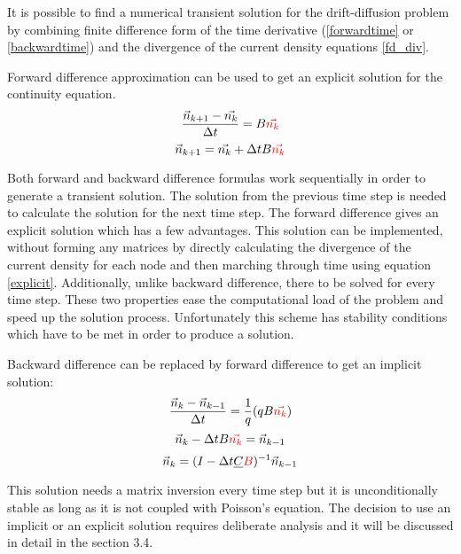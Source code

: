 \begin{doublespace}
It is possible to find a numerical transient solution for the drift-diffusion problem by combining finite difference form of the time derivative (\eqref{forwardtime} or \eqref{backwardtime}) and the divergence of the current density equations \eqref{fd_div}.

Forward difference approximation can be used to get an explicit solution for the continuity equation\cite{Dragica1}.
\begin{equation}\nonumber
\frac{ \vec{n}_{k+1}-\vec{n_k}}{\Delta t}=B \textcolor{red}{\vec{n_k}}
\end{equation}
\begin{equation}
\vec{n}_{k+1}=\vec{n_{k}}+\Delta t B \tjs{\vec{n_k}}
\label{explicit}
\end{equation}

Both forward and backward difference formulas work sequentially in order to generate a transient solution. The solution from the previous time step is needed to calculate the solution for the next time step. The forward difference gives an explicit solution which has a few advantages. This solution can be implemented, without forming any matrices by directly calculating the divergence of the current density for each node and then marching through time using equation \ref{explicit}. Additionally, unlike backward difference, there  to be solved for every time step. These two properties ease the computational load of the problem and speed up the solution process. Unfortunately this scheme has stability conditions which have to be met in order to produce a solution\cite{Dragica1}.

Backward difference can be replaced by forward difference to get an implicit solution:
\begin{equation}\nonumber
\frac{ \vec{n}_{k}-\vec{n}_{k-1}}{\Delta t}=\frac{1}{q}(qB\textcolor{red}{\vec{n_k}})
\end{equation}
\begin{equation}\nonumber
\vec{n}_{k}-\Delta t B\textcolor{red}{\vec{n_k}} =\vec{n}_{k-1}
\end{equation}
% 
\begin{equation}
\vec{n}_k=(I-\Delta t \tjsr{C}{B})^{-1}\vec{n}_{k-1}
\end{equation}
This solution needs a matrix inversion every time step but it is unconditionally stable\cite{Dragica1} as long as it is not coupled with Poisson's equation. The decision to use an implicit or an explicit solution requires deliberate analysis and it will be discussed in detail in the section 3.4.
\clearpage


\end{doublespace}

